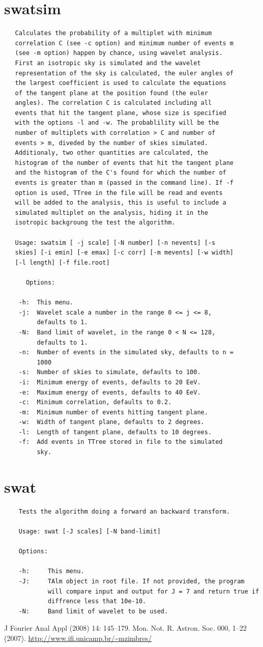 \documentclass[12pt]{article}
\begin{document}
\section{swatsim}
{ \color{brown}
   \begin{lstlisting}
   Calculates the probability of a multiplet with minimum
   correlation C (see -c option) and minimum number of events m
   (see -m option) happen by chance, using wavelet analysis.
   First an isotropic sky is simulated and the wavelet
   representation of the sky is calculated, the euler angles of
   the largest coefficient is used to calculate the equations
   of the tangent plane at the position found (the euler
   angles). The correlation C is calculated including all
   events that hit the tangent plane, whose size is specified
   with the options -l and -w. The probablility will be the
   number of multiplets with correlation > C and number of
   events > m, diveded by the number of skies simulated.
   Additionaly, two other quantities are calculated, the
   histogram of the number of events that hit the tangent plane
   and the histogram of the C's found for which the number of
   events is greater than m (passed in the command line). If -f
   option is used, TTree in the file will be read and events
   will be added to the analysis, this is useful to include a
   simulated multiplet on the analysis, hiding it in the
   isotropic backgroung the test the algorithm.

   Usage: swatsim [ -j scale] [-N number] [-n nevents] [-s
   skies] [-i emin] [-e emax] [-c corr] [-m mevents] [-w width]
   [-l length] [-f file.root]

      Options:

    -h:  This menu.
    -j:  Wavelet scale a number in the range 0 <= j <= 8,
         defaults to 1.
    -N:  Band limit of wavelet, in the range 0 < N <= 128,
         defaults to 1.
    -n:  Number of events in the simulated sky, defaults to n =
         1000
    -s:  Number of skies to simulate, defaults to 100.
    -i:  Minimum energy of events, defaults to 20 EeV.
    -e:  Maximum energy of events, defaults to 40 EeV.
    -c:  Minimum correlation, defaults to 0.2.
    -m:  Minimum number of events hitting tangent plane.
    -w:  Width of tangent plane, defaults to 2 degrees.
    -l:  Length of tangent plane, defaults to 10 degrees.
    -f:  Add events in TTree stored in file to the simulated
         sky.
   \end{lstlisting}
}
\section{swat}
{ \color{brown}
   \begin{lstlisting}
    Tests the algorithm doing a forward an backward transform.

    Usage: swat [-J scales] [-N band-limit]

    Options:

    -h:     This menu.
    -J:     TAlm object in root file. If not provided, the program
            will compare input and output for J = 7 and return true if
            diffrence less that 10e-10.  
    -N:     Band limit of wavelet to be used.
   \end{lstlisting}
}


\begin{thebibliography}{99}
 J Fourier Anal Appl (2008) 14: 145–179.
 Mon. Not. R. Astron. Soc. 000, 1–22 (2007). 
 \url{http://www.ifi.unicamp.br/~mzimbres/}
\end{thebibliography}
\end{document}
